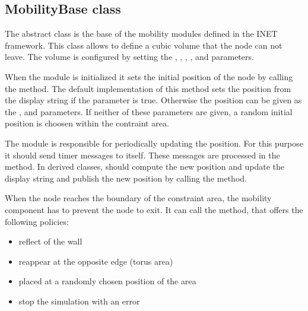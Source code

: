 

\subsection{MobilityBase class}

The abstract  class is the base of the mobility
modules defined in the INET framework. This class allows to define
a cubic volume that the node can not leave. The volume is configured
by setting the , ,
,
,  and
 parameters.

When the module is initialized it sets the initial position of the node
by calling the  method.
The default implementation of this method sets the position from the
display string if the  parameter is true.
Otherwise the position can be given as the ,
 and  parameters.
If neither of these parameters are given,
a random initial position is choosen within the contraint area.

The module is responsible for periodically updating the position.
For this purpose it should send timer messages to itself. These messages
are processed in the  method. In derived
classes,  should compute the new position
and update the display string and publish the new position by calling
the  method.

When the node reaches the boundary of the constraint area, the mobility
component has to prevent the node to exit. It can call the
 method, that offers the following policies:

\begin{itemize}
  \item reflect of the wall
  \item reappear at the opposite edge (torus area)
  \item placed at a randomly chosen position of the area
  \item stop the simulation with an error
\end{itemize}

